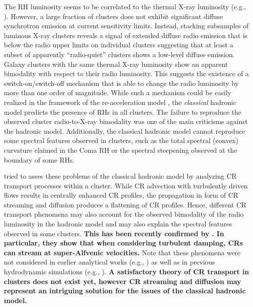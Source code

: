 \documentclass[useAMS,usenatbib]{mn2e}
\begin{document}
The RH luminosity seems to be correlated to the thermal X-ray luminosity (e.g.,
\citealp{2009A&A...507..661B,2011A&A...527A..99E}). However, a large fraction
of clusters does not exhibit significant diffuse synchrotron emission at current
sensitivity limits. Instead, stacking subsamples of luminous X-ray clusters
reveals a signal of extended diffuse radio emission that is below
the radio upper limits on individual clusters \citep{2011ApJ...740L..28B}
suggesting that at least a subset of apparently ``radio-quiet'' clusters shows a
low-level diffuse emission. Galaxy clusters with the same thermal X-ray
luminosity show an apparent bimodality with respect to their radio
luminosity. 
This suggests the existence of a switch-on/switch-off mechanism that is able to change the
radio luminosity by more than one order of magnitude.  While such a mechanism
could be easily realized in the framework of the re-acceleration model
\citep{2009A&A...507..661B}, the \emph{classical} hadronic model predicts the
presence of RHs in all clusters. The failure to reproduce the observed cluster
radio-to-X-ray bimodality was one of the main criticisms against the hadronic
model.  Additionally, the classical hadronic model cannot reproduce some
spectral features observed in clusters, such as the total spectral (convex)
curvature claimed in the Coma RH or the spectral steepening observed at
the boundary of some RHs. 

\cite{2011A&A...527A..99E} tried to asses these problems of the classical hadronic 
model by analyzing CR transport processes within a cluster. While CR advection with 
turbulently driven flows results in centrally enhanced CR profiles, the propagation in 
form of CR streaming and diffusion produces a flattening of CR profiles. Hence, 
different CR transport phenomena may also account for the observed bimodality 
of the radio luminosity in the hadronic model and may also explain the spectral 
features observed in some clusters. {\bf This has been recently confirmed 
by \cite{2013arXiv1303.4746W}. In particular, they show that when considering turbulent
damping, CRs can stream at super-Alfvenic velocities.} 
Note that these phenomena were not considered in earlier analytical works 
(e.g., \citealp{2004A&A...413...17P}) as well as in previous hydrodynamic 
simulations (e.g., \citealp{2001ApJ...562..233M, 
2008MNRAS.385.1211P, 2010MNRAS.409..449P}).
{\bf A satisfactory theory of CR transport in clusters does not exist yet, 
however CR streaming and diffusion may represent an intriguing solution
for the issues of the classical hadronic model.}
\end{document}

